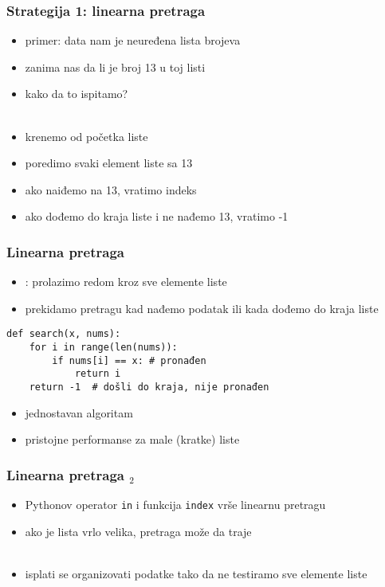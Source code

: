 \documentclass[utf8,compress,aspectratio=169]{beamer}
\begin{document}
\begin{frame}[fragile]
  \frametitle{Strategija 1: linearna pretraga}
  \begin{itemize}
    \item primer: data nam je neuređena lista brojeva
    \item zanima nas da li je broj 13 u toj listi
    \item kako da to ispitamo? \\ \ \\
    \item krenemo od početka liste
    \item poredimo svaki element liste sa 13
    \item ako naiđemo na 13, vratimo indeks
    \item ako dođemo do kraja liste i ne nađemo 13, vratimo -1
  \end{itemize}
\end{frame}

\begin{frame}[fragile]
  \frametitle{Linearna pretraga}
  \begin{itemize}
    \item {}: prolazimo redom kroz sve elemente liste
    \item prekidamo pretragu kad nađemo podatak ili kada dođemo do kraja liste
  \end{itemize}
\begin{verbatim}
def search(x, nums):
    for i in range(len(nums)):
        if nums[i] == x: # pronađen
            return i
    return -1  # došli do kraja, nije pronađen
\end{verbatim}
  \begin{itemize}
    \item jednostavan algoritam
    \item pristojne performanse za male (kratke) liste
  \end{itemize}
\end{frame}

\begin{frame}[fragile]
  \frametitle{Linearna pretraga $_2$}
  \begin{itemize}
    \item Pythonov operator \texttt{in} i funkcija \texttt{index} vrše linearnu pretragu
    \item ako je lista vrlo velika, pretraga može da traje \\ \ \\
    \item isplati se organizovati podatke tako da ne testiramo sve elemente liste
  \end{itemize}
\end{frame}
\end{document}
